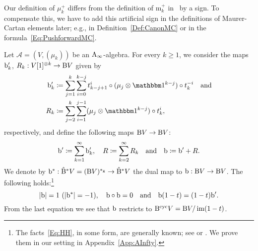 \documentclass[\MainFolder/Text.tex]{subfiles}
\begin{document}
\begin{Remark}\label{Rem:mukplus}
Our definition of $\mu_k^+$ differs from the definition of $\mathrm{m}_k^+$ in~\cite[Definition 12.1]{Cieliebak2015} by a sign. To compensate this, we have to add this artificial sign in the definitions of Maurer-Cartan elements later; e.g., in Definition~\ref{Def:CanonMC} or in the formula~\eqref{Eq:PushforwardMC}.
\end{Remark}
\begin{Definition}\label{Def:CycHom}
Let $\mathcal{A}=(V,(\mu_k))$ be an $\mathrm{A}_\infty$-algebra. For every $k\ge 1$, we consider the maps $\mathrm{b}'_k$, $R_k: V[1]^{\otimes k} \rightarrow \mathrm{B} V$ given by 
\begin{equation}\label{Eq:bRH} \begin{aligned}\Hd'_k & \coloneqq \sum_{j=1}^k \sum_{i=0}^{k-j} t^i_{k-j+1}\circ(\mu_j \otimes \Id^{k-j})\circ t_k^{-i}\quad\text{and}\\
R_k &\coloneqq \sum_{j=2}^k \sum_{i=1}^{j-1} (\mu_j\otimes \Id^{k-j})\circ t_k^{i}, \end{aligned}
\end{equation}
respectively, and define the following maps $\mathrm{B} V \rightarrow \mathrm{B} V$:
\begin{equation*}
\mathrm{b}'\coloneqq \sum_{k=1}^{\infty} \mathrm{b}'_k, \quad R\coloneqq \sum_{k=2}^\infty R_k\quad\text{and}\quad \mathrm{b}\coloneqq \mathrm{b}' + R.
\end{equation*}
We denote by $\mathrm{b}^*: \hat{\mathrm{B}}^* V = (\mathrm{B} V)^{*_{\mathrm{g}}} \rightarrow \hat{\mathrm{B}}^* V$ the dual map to $\mathrm{b}: \mathrm{B} V \rightarrow \mathrm{B} V$.  The following holds:\footnote{The facts~\eqref{Eq:HH}, in some form, are generally known; see \cite{Mescher2016} or \cite{Lazarev2003}. We prove them in our setting in Appendix~\ref{App:AInfty}.}
\begin{equation} \label{Eq:HH}
|\mathrm{b}| = 1\ (|\mathrm{b}^*|=-1), \quad \mathrm{b}\circ \mathrm{b} = 0 \quad\text{and}\quad \mathrm{b}(1-t) = (1-t)\mathrm{b}'.
\end{equation} 
From the last equation we see that $\mathrm{b}$ restricts to $\mathrm{B}^{\mathrm{cyc}} V = \mathrm{B} V / \operatorname{im}(1-t)$.

\end{Definition}
\end{document}
